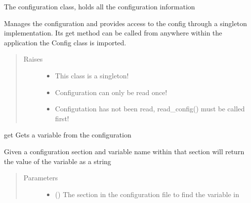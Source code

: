 \documentclass[letterpaper,10pt,english]{sphinxmanual}
\begin{document}
\begin{fulllineitems}
\label{\detokenize{index:config.config_manager.Config}}
The configuration class, holds all the configuration information

Manages the configuration and provides access to the config through a
singleton implementation. Its get method can be called from anywhere
within the application the Config class is imported.
\begin{quote}\begin{description}
\item[{Raises}] \leavevmode\begin{itemize}
\item {} 
 \textendash{} This class is a singleton!

\item {} 
 \textendash{} Configuration can only be read once!

\item {} 
 \textendash{} Configutation has not been read, read\_config() must be called first!

\end{itemize}

\end{description}\end{quote}

\begin{fulllineitems}
\label{\detokenize{index:config.config_manager.Config.get}}
get Gets a variable from the configuration

Given a configuration section and variable name within that section
will return the value of the variable as a string
\begin{quote}\begin{description}
\item[{Parameters}] \leavevmode\begin{itemize}
\item {} 
 () \textendash{} The section in the configuration file to find the variable in


\end{itemize}
\end{description}
\end{quote}
\end{fulllineitems}
\end{fulllineitems}
\end{document}
